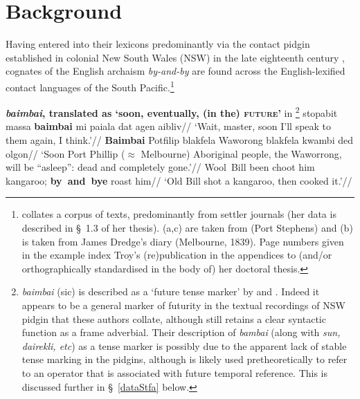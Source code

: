 \section{Background}\label{bambai.intro}

Having entered into their lexicons predominantly via the contact pidgin established in colonial New South Wales (NSW) in the late eighteenth century \citep{Troy1994}, cognates of the English archaism \textit{by-and-by} are found across the English-lexified contact languages of the South Pacific.\footnote{\citeauthor{Troy1994} collates a corpus of texts, predominantly from settler journals (her data is described in \S~1.3 of her \citeyear{Troy1994} thesis). (a,c) are taken from \citet{Dawson1831} (Port Stephens) and (b) is taken from James Dredge's diary (Melbourne, 1839). Page numbers given in the example index Troy's (re)publication in the appendices to (and/or orthographically standardised in the body of) her doctoral thesis.} 


\pex[aboveglftskip=0ex]\textbf{\textit{baimbai}, translated as `soon, eventually, (in the) \textsc{future}'} in \citet{Troy1994}\footnote{\textit{baimbai} (sic) is described as a `future tense marker' by \citet[112,418,711]{Troy1994} and \citet[268]{Harris1986a}. Indeed it appears to be a general marker of futurity in the textual recordings of NSW pidgin that these authors collate, although still retains a clear syntactic function as a frame adverbial. Their description of \textit{bambai} (along with \textit{sun, dairekli, etc}) as a tense marker is possibly due to the apparent lack of stable tense marking in the pidgins, although is likely used pretheoretically to refer to an operator that is associated with future temporal reference. This is discussed further in §~\ref{dataStfa} below.}
\a\begingl\gla stopabit massa \textbf{baimbai} mi paiala dat agen aibliv//
\glft`Wait, master, soon I'll speak to them again, I think.'//\endgl
\a\begingl\gla \textbf{Baimbai} Potfilip blakfela Waworong blakfela kwambi ded olgon//
\glft`Soon Port Phillip ($ \approx $ Melbourne) Aboriginal people, the Waworrong, will be ``asleep'': dead and completely gone.'//\endgl
\a\begingl\gla Wool~Bill been choot him kangaroo; \textbf{by~and~bye} roast him//
\glft`Old Bill shot a kangaroo, then cooked it.'//\endgl
\xe

